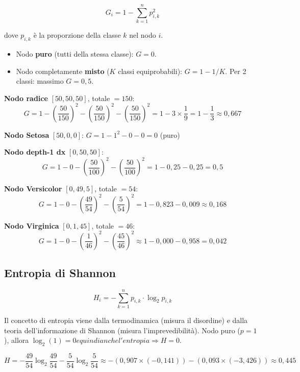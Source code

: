 \begin{equation}
\boxed{G_i = 1 - \sum_{k=1}^{n} p_{i,k}^2}
\end{equation}

dove $p_{i,k}$ è la proporzione della classe $k$ nel nodo $i$.

\begin{itemize}
    \item Nodo \textbf{puro} (tutti della stessa classe): $G = 0$.
    \item Nodo completamente \textbf{misto} ($K$ classi equiprobabili): $G = 1 - 1/K$. Per 2 classi: massimo $G = 0{,}5$.
\end{itemize}

\begin{exbox}
\textbf{Nodo radice} $[50, 50, 50]$, totale $= 150$:
\[
G = 1 - \left(\frac{50}{150}\right)^2 - \left(\frac{50}{150}\right)^2 - \left(\frac{50}{150}\right)^2
= 1 - 3 \times \frac{1}{9} = 1 - \frac{1}{3} \approx 0{,}667
\]

\textbf{Nodo Setosa} $[50, 0, 0]$: \quad $G = 1 - 1^2 - 0 - 0 = 0$ (puro)

\textbf{Nodo depth-1 dx} $[0, 50, 50]$:
\[
G = 1 - 0 - \left(\frac{50}{100}\right)^2 - \left(\frac{50}{100}\right)^2 = 1 - 0{,}25 - 0{,}25 = 0{,}5
\]

\textbf{Nodo Versicolor} $[0, 49, 5]$, totale $= 54$:
\[
G = 1 - 0 - \left(\frac{49}{54}\right)^2 - \left(\frac{5}{54}\right)^2
= 1 - 0{,}823 - 0{,}009 \approx 0{,}168
\]

\textbf{Nodo Virginica} $[0, 1, 45]$, totale $= 46$:
\[
G = 1 - 0 - \left(\frac{1}{46}\right)^2 - \left(\frac{45}{46}\right)^2
\approx 1 - 0{,}000 - 0{,}958 = 0{,}042
\]
\end{exbox}

\subsection{Entropia di Shannon}

\begin{equation}
H_i = -\sum_{k=1}^{n} p_{i,k} \cdot \log_2 p_{i,k}
\end{equation}

Il concetto di entropia viene dalla termodinamica (misura il disordine) e dalla teoria dell'informazione di Shannon (misura l'imprevedibilità). Nodo puro ($p=1$), allora $\log_2(1) = 0 e quindi anche l'entropia \Rightarrow H = 0$.

\begin{exbox}
\[
H = -\frac{49}{54}\log_2\!\frac{49}{54} - \frac{5}{54}\log_2\!\frac{5}{54}
\approx -(0{,}907 \times (-0{,}141)) - (0{,}093 \times (-3{,}426))
\approx 0{,}445
\]
\end{exbox}

